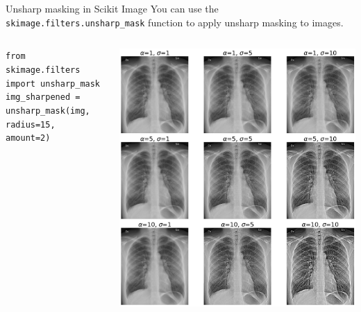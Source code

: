 \documentclass[9pt, aspectratio=169]{beamer}
\begin{document}
\begin{frame}
    {Unsharp masking in Scikit Image}
    You can use the \texttt{skimage.filters.unsharp\_mask} function to apply unsharp masking to images.

    \begin{columns}
        \begin{column}{.65\textwidth}
            \begin{codebox}
                \small{
                    \texttt{from skimage.filters import unsharp\_mask\\
                        img\_sharpened = unsharp\_mask(img, radius=15, amount=2)
                    }
                }
            \end{codebox}
            \vspace{2em}
        \end{column}
        \begin{column}{.35\textwidth}
            \includegraphics[height=.7\textheight]{unsharp_mask_parameter_space.png}
            \tiny{\color{gray}{Exploring the parameter space of unsharp masking.}\color{black}}
        \end{column}
    \end{columns}
\end{frame}
\end{document}
